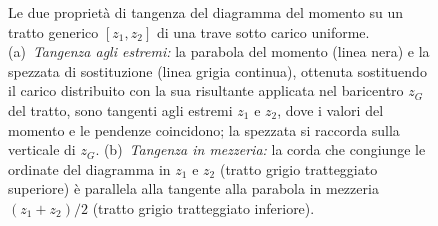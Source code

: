 \begin{figure}[htbp]
{
	}
	\caption{Le due proprietà di tangenza del diagramma del momento su un
		tratto generico $[z_1, z_2]$ di una trave sotto carico uniforme.
		(a)~\emph{Tangenza agli estremi:} la parabola del momento (linea
		nera) e la spezzata di sostituzione (linea grigia continua),
		ottenuta sostituendo il carico distribuito con la sua risultante
		applicata nel baricentro $z_G$ del tratto, sono tangenti agli
		estremi $z_1$ e $z_2$, dove i valori del momento e le pendenze
		coincidono; la spezzata si raccorda sulla verticale di $z_G$.
		(b)~\emph{Tangenza in mezzeria:} la corda che congiunge le ordinate
		del diagramma in $z_1$ e $z_2$ (tratto grigio tratteggiato
		superiore) è parallela alla tangente alla parabola in mezzeria
		$(z_1+z_2)/2$ (tratto grigio tratteggiato inferiore).}
	\label{fig:stat_tangenze}
\end{figure}
